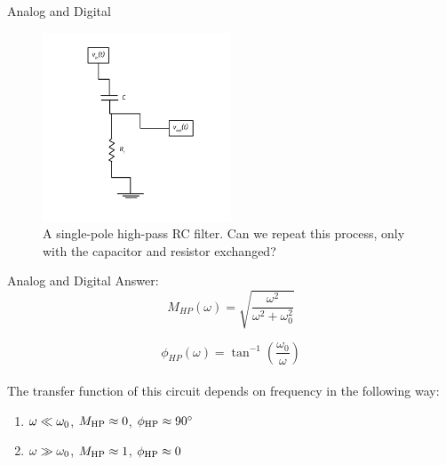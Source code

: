 \documentclass{beamer}
\begin{document}
\begin{frame}{Analog and Digital}
\begin{figure}
\centering
\includegraphics[width=0.5\textwidth]{AnalogExample/HighPass.pdf}
\caption{\label{fig:example3} A single-pole high-pass RC filter.  Can we repeat this process, only with the capacitor and resistor exchanged?}
\end{figure}
\end{frame}

\begin{frame}{Analog and Digital}
Answer:
\begin{equation}
\boxed{
M_{HP}(\omega) = \sqrt{\frac{\omega^2}{\omega^2+\omega_0^2}}
}
\label{eq:eq8}
\end{equation}

\begin{equation}
\boxed{
\phi_{HP}(\omega) = \tan^{-1}\left(\frac{\omega_0}{\omega}\right)
}
\label{eq:eq9}
\end{equation} \\
\vspace{0.5cm}
The transfer function of this circuit depends on frequency in the following way:
\begin{enumerate}
\item $\omega \ll \omega_{\rm 0}$, $M_{\rm HP} \approx 0$, $\phi_{\rm HP} \approx 90^{\circ}$
\item $\omega \gg \omega_{\rm 0}$, $M_{\rm HP} \approx 1$, $\phi_{\rm HP} \approx 0$
\end{enumerate}
\end{frame}
\end{document}
